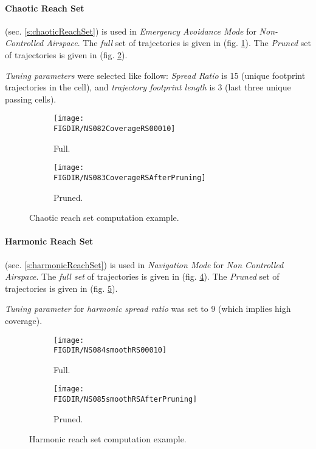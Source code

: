 \paragraph{Chaotic Reach Set} (sec. \ref{s:chaoticReachSet}) is used in \emph{Emergency Avoidance Mode} for \emph{Non-Controlled Airspace}. The \emph{full} set of trajectories is given in (fig. \ref{fig:chaoticComputed}). The \emph{Pruned} set of trajectories is given in (fig. \ref{fig:chaoticPruned}).

\emph{Tuning parameters} were selected like follow: \emph{Spread Ratio} is 15 (unique footprint trajectories in the cell), and \emph{trajectory footprint length} is $3$ (last three unique passing cells). 


\begin{figure}[H]
    \centering
    \begin{subfigure}{0.48\textwidth}
    	\centering
        \texttt{[image: \\FIGDIR/NS082CoverageRS00010]}
        \caption{Full.}
        \label{fig:chaoticComputed}
    \end{subfigure}
    \begin{subfigure}{0.48\textwidth}
    	\centering
        \texttt{[image: \\FIGDIR/NS083CoverageRSAfterPruning]} 
        \caption{Pruned.}
        \label{fig:chaoticPruned}
    \end{subfigure}
    \caption{Chaotic reach set computation example.}
    \label{fig:chaoticReachSetComputationExample}
\end{figure}

\paragraph{Harmonic Reach Set} (sec. \ref{s:harmonicReachSet}) is used in \emph{Navigation Mode} for \emph{Non Controlled Airspace}. The \emph{full set} of trajectories is given in (fig. \ref{fig:harmonicComputed}). The \emph{Pruned} set of trajectories is given in (fig. \ref{fig:harmonicPruned}).

\emph{Tuning parameter} for \emph{harmonic spread ratio} was set to 9 (which implies high coverage).

\begin{figure}[H]
    \centering
    \begin{subfigure}{0.48\textwidth}
    	\centering
        \texttt{[image: \\FIGDIR/NS084smoothRS00010]}
        \caption{Full.}
        \label{fig:harmonicComputed}
    \end{subfigure}
    \begin{subfigure}{0.48\textwidth}
    	\centering
        \texttt{[image: \\FIGDIR/NS085smoothRSAfterPruning]} 
        \caption{Pruned.}
        \label{fig:harmonicPruned}
    \end{subfigure}
    \caption{Harmonic reach set computation example.}
    \label{fig:harmonicReachSetComputationExample}
\end{figure}

